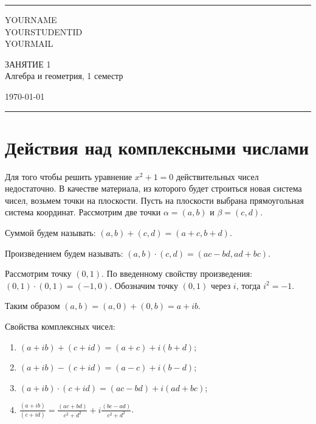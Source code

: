 \documentclass[a4paper, 12pt]{article}
\begin{document}

\fancyhead[C]{}
\hrule \medskip %
\begin{minipage}{0.295\textwidth} 
\raggedright\footnotesize
YOURNAME \hfill\\   
YOURSTUDENTID \hfill\\
YOURMAIL
\end{minipage}
\begin{minipage}{0.4\textwidth} 
\centering\large 
ЗАНЯТИЕ 1\\ 
\normalsize 
Алгебра и геометрия, 1 семестр\\ 
\end{minipage}
\begin{minipage}{0.295\textwidth} 
\raggedleft
\today\hfill\\
\end{minipage}
\medskip\hrule 
\bigskip


\section{Действия над комплексными числами}
Для того чтобы решить уравнение ${x^2+1=0}$ действительных чисел недостаточно.
В качестве материала, из которого будет строиться новая система чисел,
возьмем точки на плоскости. Пусть на плоскости выбрана прямоугольная система координат.
Рассмотрим две точки ${\alpha=(a,b)}$ и ${\beta=(c,d)}$.

Суммой будем называть: $(a,b)+(c,d)=(a+c,b+d)$.

Произведением будем называть: $(a,b)\cdot(c,d)=(ac-bd, ad+bc)$.

Рассмотрим точку $(0,1)$. По введенному свойству произведения: $(0,1)\cdot(0,1)=(-1,0)$. 
Обозначим точку $(0,1)$ через {\flqq}$i${\frqq}, тогда $i^2=-1$.

Таким образом $(a,b)=(a,0)+(0,b)=a+ib$.

Свойства комплексных чисел:
\begin{enumerate}
 \item $(a+ib)+(c+id)=(a+c)+i(b+d)$;
 \item $(a+ib)-(c+id)=(a-c)+i(b-d)$;
 \item $(a+ib)\cdot(c+id)=(ac-bd)+i(ad+bc)$;
 \item $\displaystyle\frac{(a+ib)}{(c+id)}=\displaystyle\frac{(ac+bd)}{c^2+d^2}+i\displaystyle\frac{(bc-ad)}{c^2+d^2}$.
\end{enumerate}
\end{document}
